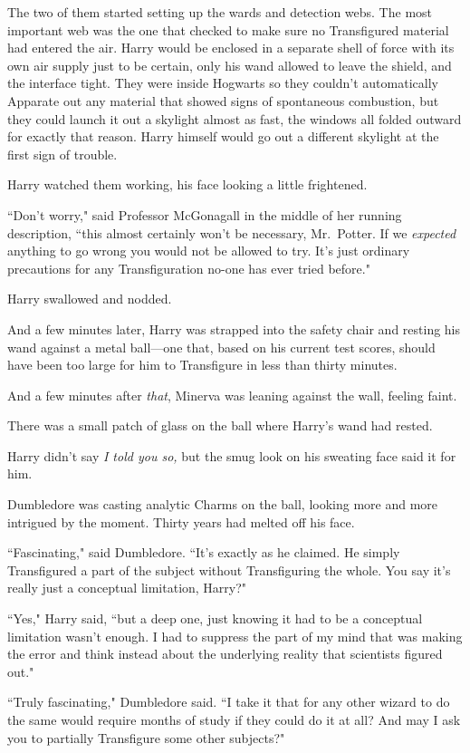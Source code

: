 The two of them started setting up the wards and detection webs. The most important web was the one that checked to make sure no Transfigured material had entered the air. Harry would be enclosed in a separate shell of force with its own air supply just to be certain, only his wand allowed to leave the shield, and the interface tight. They were inside Hogwarts so they couldn't automatically Apparate out any material that showed signs of spontaneous combustion, but they could launch it out a skylight almost as fast, the windows all folded outward for exactly that reason. Harry himself would go out a different skylight at the first sign of trouble.

Harry watched them working, his face looking a little frightened.

``Don't worry," said Professor McGonagall in the middle of her running description, ``this almost certainly won't be necessary, Mr.~Potter. If we \emph{expected} anything to go wrong you would not be allowed to try. It's just ordinary precautions for any Transfiguration no-one has ever tried before."

Harry swallowed and nodded.

And a few minutes later, Harry was strapped into the safety chair and resting his wand against a metal ball—one that, based on his current test scores, should have been too large for him to Transfigure in less than thirty minutes.

And a few minutes after \emph{that}, Minerva was leaning against the wall, feeling faint.

There was a small patch of glass on the ball where Harry's wand had rested.

Harry didn't say \emph{I told you so,} but the smug look on his sweating face said it for him.

Dumbledore was casting analytic Charms on the ball, looking more and more intrigued by the moment. Thirty years had melted off his face.

``Fascinating," said Dumbledore. ``It's exactly as he claimed. He simply Transfigured a part of the subject without Transfiguring the whole. You say it's really just a conceptual limitation, Harry?"

``Yes," Harry said, ``but a deep one, just knowing it had to be a conceptual limitation wasn't enough. I had to suppress the part of my mind that was making the error and think instead about the underlying reality that scientists figured out."

``Truly fascinating," Dumbledore said. ``I take it that for any other wizard to do the same would require months of study if they could do it at all? And may I ask you to partially Transfigure some other subjects?"

